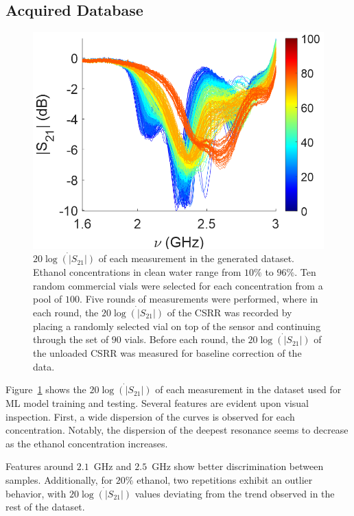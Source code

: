 \documentclass[journal,twoside,web]{ieeecolor}
\begin{document}
\subsection{Acquired Database}
\label{ssec:mlMeasurement}
\begin{figure}[!t]
	\centering
	\includegraphics [trim = 0mm 0mm 0mm 0mm, clip, width=1\columnwidth]{figures/fig4_3.png}
	\caption{$20\dot{\log\left(|S_{21}|\right)}$ of each measurement in the generated dataset. Ethanol concentrations in clean water range from $10\%$ to $96\%$. Ten random commercial vials were selected for each concentration from a pool of $100$. Five rounds of measurements were performed, where in each round, the $20\dot{\log\left(|S_{21}|\right)}$ of the CSRR was recorded by placing a randomly selected vial on top of the sensor and continuing through the set of $90$ vials. Before each round, the $20\dot{\log\left(|S_{21}|\right)}$ of the unloaded CSRR was measured for baseline correction of the data.}
	\label{fig:mlMeasTaken}
	\vspace{-0.3cm}
\end{figure}

Figure~\ref{fig:mlMeasTaken} shows the $20\dot{\log\left(|S_{21}|\right)}$ of each measurement in the dataset used for ML model training and testing. Several features are evident upon visual inspection. First, a wide dispersion of the curves is observed for each concentration. Notably, the dispersion of the deepest resonance seems to decrease as the ethanol concentration increases.

Features around $2.1$~GHz and $2.5$~GHz show better discrimination between samples. Additionally, for $20\%$ ethanol, two repetitions exhibit an outlier behavior, with $20\dot{\log\left(|S_{21}|\right)}$ values deviating from the trend observed in the rest of the dataset.
\end{document}
